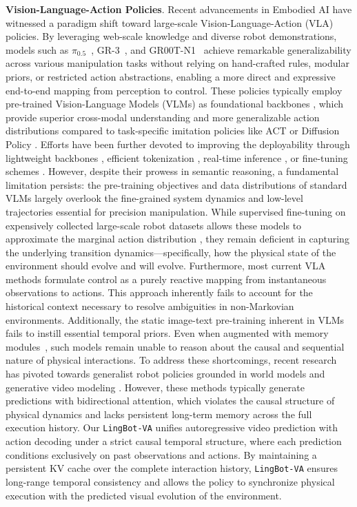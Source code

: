 \documentclass[onecolumn]{robbyant}           %
\newcommand\methodname{LingBot-VA}
\newcommand{\method}{\texttt{\methodname}\xspace}
\begin{document}
\noindent \textbf{Vision-Language-Action Policies}.
Recent advancements in Embodied AI have witnessed a paradigm shift toward large-scale Vision-Language-Action (VLA) policies. 
By leveraging web-scale knowledge and diverse robot demonstrations, models such as $\pi_{0.5}$~\cite{pi2025pi05}, GR-3~\cite{gr3}, and GR00T-N1~\cite{bjorck2025} achieve remarkable generalizability across various manipulation tasks without relying on hand-crafted rules, modular priors, or restricted action abstractions, enabling a more direct and expressive end-to-end mapping from perception to control.
These policies typically employ pre-trained Vision-Language Models (VLMs) as foundational backbones \cite{pi2025pi05,pi0,gr3,bjorck2025,rt2,kim2024,yang2025_1,xvla}, which provide superior cross-modal understanding and more generalizable action distributions compared to task-specific imitation policies like ACT \cite{act} or Diffusion Policy \cite{diffusionpolicy}.
Efforts have been further devoted to improving the deployability through lightweight backbones \cite{shukor2025,liu2025b,reuss2025}, efficient tokenization \cite{pertsch2025}, real-time inference \cite{rtc,black2025training,tang2025vlash}, or fine-tuning schemes \cite{kim2025,li2025simplevla,jing2025mixture}.
However, despite their prowess in semantic reasoning, a fundamental limitation persists: the pre-training objectives and data distributions of standard VLMs largely overlook the fine-grained system dynamics and low-level trajectories essential for precision manipulation. 
While supervised fine-tuning on expensively collected large-scale robot datasets allows these models to approximate the marginal action distribution \cite{droid,oxe,barreiros2025careful}, they remain deficient in capturing the underlying transition dynamics---specifically, how the physical state of the environment should evolve and will evolve.
Furthermore, most current VLA methods formulate control as a purely reactive mapping from instantaneous observations to actions. This approach inherently fails to account for the historical context necessary to resolve ambiguities in non-Markovian environments. Additionally, the static image-text pre-training inherent in VLMs fails to instill essential temporal priors. Even when augmented with memory modules~\cite{sridhar2025memer, li2025cronusvla,shi2025a}, such models remain unable to reason about the causal and sequential nature of physical interactions.
To address these shortcomings, recent research has pivoted towards generalist robot policies grounded in world models and generative video modeling \cite{onexwm, uva, uwm, shen2025videovla, motus}. 
However, these methods typically generate predictions with bidirectional attention, which violates the causal structure of physical dynamics and lacks persistent long-term memory across the full execution history. Our \method unifies autoregressive video prediction with action decoding under a strict causal temporal structure, where each prediction conditions exclusively on past observations and actions. By maintaining a persistent KV cache over the complete interaction history, \method ensures long-range temporal consistency and allows the policy to synchronize physical execution with the predicted visual evolution of the environment. 
\end{document}
